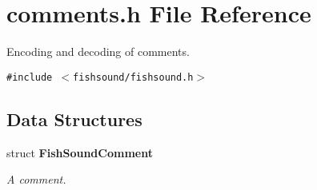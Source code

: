 \section{comments.h File Reference}
\label{comments_8h}
Encoding and decoding of comments.  


{\tt \#include $<$fishsound/fishsound.h$>$}\par
\subsection*{Data Structures}
\begin{CompactItemize}
\item 
struct {\bf Fish\-Sound\-Comment}
\begin{CompactList}\small\item\em A comment. \item\end{CompactList}\end{CompactItemize}
